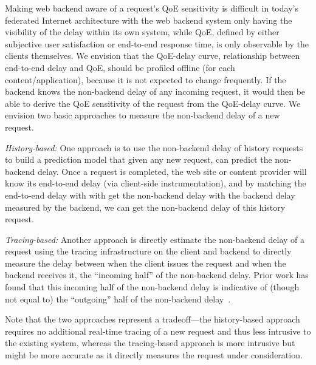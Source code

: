 Making web backend aware of a request's QoE sensitivity is difficult in today's federated Internet architecture with the web backend system only having the visibility of the delay within its own system, while QoE, defined by either subjective user satisfaction or end-to-end response time, is only observable by the clients themselves. 
We envision that the QoE-delay curve, \ie relationship between end-to-end delay and QoE, should be profiled offline (for each content/application), because it is not expected to change frequently.
If the backend knows the non-backend delay of any incoming request, it would then be able to derive the QoE sensitivity of the request from the QoE-delay curve. 
We envision two basic approaches to measure the non-backend delay of a new request. 
\begin{packeditemize}
\item {\em History-based:}
One approach is to use the non-backend delay of history requests to build a prediction model that given any new request, can predict the non-backend delay. Once a request is completed, the web site or content provider will know its end-to-end delay (\eg via client-side instrumentation), and by matching the end-to-end delay with with get the non-backend delay with the backend delay measured by the backend, we can get the non-backend delay of this history request.

\item {\em Tracing-based:}
Another approach is directly estimate the non-backend delay of a request using the tracing infrastructure on the client and backend to directly measure the delay between when the client issues the request and when the backend receives it, \ie the ``incoming half'' of the non-backend delay. Prior work has found that this incoming half of the non-backend delay is indicative of (though not equal to) the ``outgoing'' half of the non-backend delay~\cite{timecard}.
\end{packeditemize}
Note that the two approaches represent a tradeoff---the history-based approach requires no additional real-time tracing of a new request and thus less intrusive to the existing system, whereas the tracing-based approach is more intrusive but might be more accurate as it directly measures the request under consideration.


